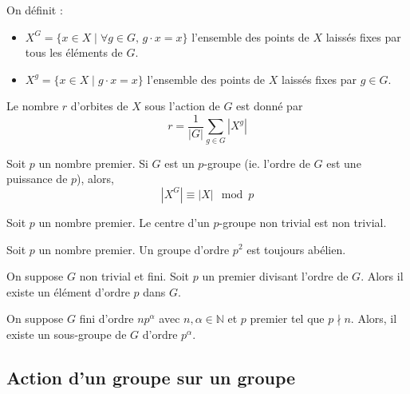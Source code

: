  \begin{definition}
    On définit :
    \begin{itemize}
      \item $X^G = \{ x \in X \mid \forall g \in G, \, g \cdot x = x \}$ l'ensemble des points de $X$ laissés fixes par tous les éléments de $G$.
      \item $X^g = \{ x \in X \mid g \cdot x = x \}$ l'ensemble des points de $X$ laissés fixes par $g \in G$.
    \end{itemize}
  \end{definition}

  \begin{corollary}
    Le nombre $r$ d'orbites de $X$ sous l'action de $G$ est donné par
    \[ r = \frac{1}{|G|} \sum_{g \in G} |X^g| \]
  \end{corollary}

  \begin{corollary}
    Soit $p$ un nombre premier. Si $G$ est un $p$-groupe (ie. l'ordre de $G$ est une puissance de $p$), alors,
    \[ |X^G| \equiv |X| \mod p \]
  \end{corollary}

  \begin{corollary}
    Soit $p$ un nombre premier. Le centre d'un $p$-groupe non trivial est non trivial.
  \end{corollary}

  \begin{corollary}
    Soit $p$ un nombre premier. Un groupe d'ordre $p^2$ est toujours abélien.
  \end{corollary}

  \begin{application}
    On suppose $G$ non trivial et fini. Soit $p$ un premier divisant l'ordre de $G$. Alors il existe un élément d'ordre $p$ dans $G$.
  \end{application}


  \begin{application}
    On suppose $G$ fini d'ordre $n p^\alpha$ avec $n, \alpha \in \mathbb{N}$ et $p$ premier tel que $p \nmid n$. Alors, il existe un sous-groupe de $G$ d’ordre $p^\alpha$.
  \end{application}

  \subsection{Action d'un groupe sur un groupe}

